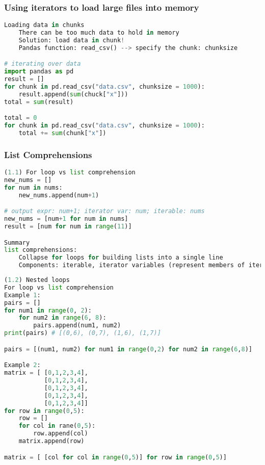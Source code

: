 \documentclass[12pt]{article}
\begin{document}
\subsubsection{\normalsize Using iterators to load large files into memory}
\begin{lstlisting}[language=Python]
Loading data in chunks
    There can be too much data to hold in memory
    Solution: load data in chunk!
    Pandas function: read_csv() --> specify the chunk: chunksize

# iterating over data
import pandas as pd
result = []
for chunk in pd.read_csv("data.csv", chunksize = 1000):
    result.append(sum(chuck["x"]))
total = sum(result)

total = 0
for chunk in pd.read_csv("data.csv", chunksize = 1000):
    total += sum(chunk["x"])
\end{lstlisting}

\subsubsection{\normalsize List Comprehensions}
\begin{lstlisting}[language=Python]
(1.1) For loop vs list comprehension
new_nums = []
for num in nums:
    new_nums.append(num+1)

# output expr: num+1; iterator var: num; iterable: nums
new_nums = [num+1 for num in nums] 
result = [num for num in range(11)]

Summary 
list comprehensions:
    Collapse for loops for building lists into a single line
    Components: iterable, iterator variables (represent members of iterables), output expression
\end{lstlisting}

\begin{lstlisting}[language=Python]
(1.2) Nested loops
For loop vs list comprehension
Example 1:
pairs = []
for num1 in range(0, 2):
    for num2 in range(6, 8):
        pairs.append(num1, num2)
print(pairs) # [(0,6), (0,7), (1,6), (1,7)]

pairs = [(num1, num2) for num1 in range(0,2) for num2 in range(6,8)]

Example 2: 
matrix = [ [0,1,2,3,4],
           [0,1,2,3,4],
           [0,1,2,3,4],
           [0,1,2,3,4],
           [0,1,2,3,4]]
for row in range(0,5):
    row = []
    for col in rane(0,5):
        row.append(col)
    matrix.append(row)

matrix = [ [col for col in range(0,5)] for row in range(0,5)]
\end{lstlisting}
\end{document}
